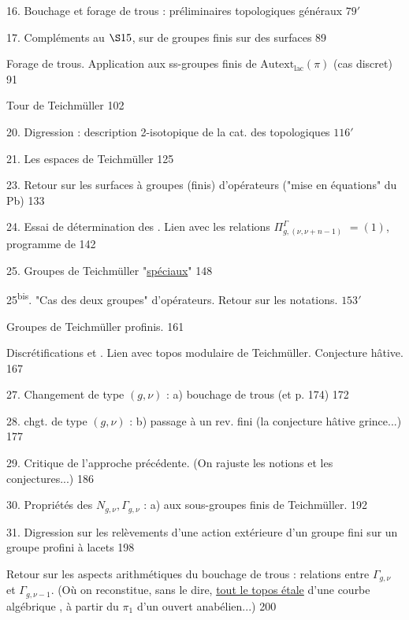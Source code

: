 16. Bouchage et forage de trous : préliminaires topologiques généraux
\hfill \(79'\)

17. Compléments au \(\S 15\), sur  de groupes finis
sur des surfaces \hfill 89

 Forage de trous. Application aux ss-groupes
finis de \(\mathrm{Autext}_{\mathrm{lac}}(\pi)\)
(cas discret) \hfill 91

 Tour de Teichmüller \hfill 102

20. Digression : description 2-isotopique
de la cat. des  topologiques \hfill \(116'\)

21. Les espaces de Teichmüller \hfill 125


23. Retour sur les surfaces à groupes (finis) d'opérateurs
("mise en équations" du Pb) \hfill 133

24. Essai de détermination des . Lien avec les relations
\(\Pi_{g,(\nu,\nu+n-1)}^{\Gamma}\) \(=(1)\),
programme de  \hfill 142

25. Groupes de Teichmüller "\uline{spéciaux}" \hfill 148

25\textsuperscript{bis}. "Cas des deux groupes" d'opérateurs. Retour sur les notations.
\hfill \(153'\)

 Groupes de Teichmüller profinis. \hfill 161

Discrétifications et . Lien avec topos
modulaire de Teichmüller. Conjecture hâtive. \hfill 167

27. Changement de type \((g,\nu)\) : a) bouchage de trous
(et  p. 174) \hfill 172

28. chgt. de type \((g,\nu)\) : b) passage à un rev. fini
(la conjecture hâtive grince...) \hfill 177

29. Critique de l'approche précédente. (On rajuste
les notions et les conjectures...) \hfill 186

30. Propriétés des \(N_{g,\nu},\Gamma_{g,\nu}\) : a)
 aux sous-groupes finis de Teichmüller.
\hfill 192

31. Digression sur les relèvements d'une action extérieure d'un groupe
fini sur un groupe profini à lacets \hfill 198

 Retour sur les aspects arithmétiques du bouchage de trous :
relations entre \(\Gamma_{g,\nu}\) et \(\Gamma_{g,\nu-1}\).
(Où on reconstitue, sans le dire, \uline{tout le topos étale} d'une
courbe algébrique , à partir du \(\pi_1\) d'un
ouvert anabélien...) \hfill 200

